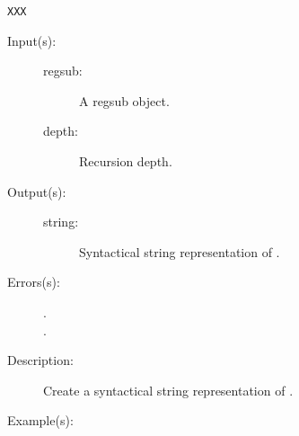 \begin{description}
\begin{description}
\begin{verbatim}
XXX
		\end{verbatim}
	\end{description}
\label{sprintsdict:regsubtype}
\item[{\onyxop{regsub depth}{regsubtype}{string}}: ]
	\begin{description}\item[]
	\item[Input(s): ]
		\begin{description}\item[]
		\item[regsub: ]
			A regsub object.
		\item[depth: ]
			Recursion depth.
		\end{description}
	\item[Output(s): ]
		\begin{description}\item[]
		\item[string: ]
			Syntactical string representation of .
		\end{description}
	\item[Errors(s): ]
		\begin{description}\item[]
		\item[.]
		\item[.]
		\end{description}
	\item[Description: ]
		Create a syntactical string representation of .
	\item[Example(s): ]\begin{verbatim}


\end{verbatim}
\end{description}
\end{description}
